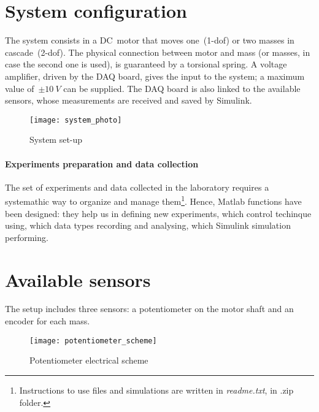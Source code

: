
\section{System configuration}

The system consists in a DC~motor that moves one~(\acrshort{1-dof}) or two masses in cascade~(\acrshort{2-dof}). The physical connection between motor and mass (or masses, in case the second one is used), is guaranteed by a torsional spring.
A voltage amplifier, driven by the DAQ board, gives the input to the system; a maximum value of~$\pm 10 \ V$ can be supplied. The DAQ board is also linked to the available sensors, whose measurements are received and saved by Simulink.
\begin{figure}[h]
	\centering
	\texttt{[image: system\_photo]}
	\caption{System set-up}
\end{figure}

\paragraph{Experiments preparation and data collection}

The set of experiments and data collected in the laboratory requires a systemathic way to organize and manage them\footnote{Instructions to use files and simulations are written in \textit{readme.txt}, in .zip folder.}. Hence, Matlab functions have been designed: they help us in defining new experiments, which control techinque using, which data types recording and analysing, which Simulink simulation performing.

\section{Available sensors} \label{sec:sensors}

The setup includes three sensors: a potentiometer on the motor shaft and an encoder for each mass.
\begin{wrapfigure}{r}{0.3\textwidth}
	\texttt{[image: potentiometer\_scheme]}
	\caption{Potentiometer electrical scheme}
\end{wrapfigure}

